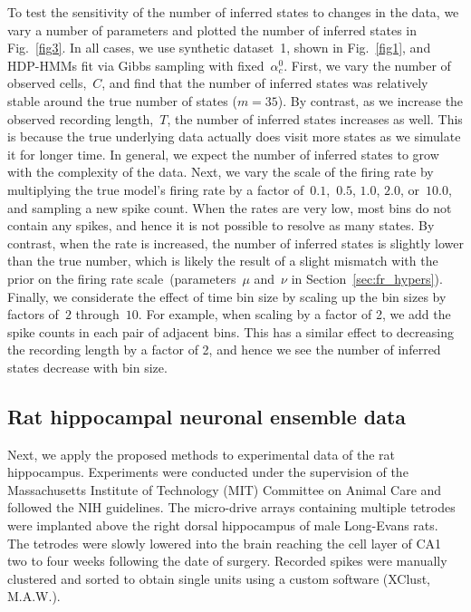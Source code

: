 To test the sensitivity of the number of inferred states to changes in the data, we vary a number of parameters and plotted the number of inferred states in Fig.~\ref{fig3}. In all cases, we use synthetic dataset~1, shown in Fig.~\ref{fig1}, and HDP-HMMs fit via Gibbs sampling with fixed~$\alpha_c^0$. First, we vary the number of observed cells,~$C$, and find that the number of inferred states was relatively stable around the true number of states ($m=35$). By contrast, as we increase the observed recording length,~$T$, the number of inferred states increases as well. This is because the true underlying data actually does visit more states as we simulate it for longer time. In general, we expect the number of inferred states to grow with the complexity of the data. Next, we vary the scale of the firing rate by multiplying the true model's firing rate by a factor of~$0.1$,~$0.5$, $1.0$, $2.0$, or~$10.0$, and sampling a new spike count. When the rates are very low, most bins do not contain any spikes, and hence it is not possible to resolve as many states. By contrast, when the rate is increased, the number of inferred states is slightly lower than the true number, which is likely the result of a slight mismatch with the prior on the firing rate scale~(parameters~$\mu$ and~$\nu$ in Section~\ref{sec:fr_hypers}). Finally, we considerate the effect of time bin size by scaling up the bin sizes by factors of~$2$ through~$10$. For example, when scaling by a factor of 2, we add the spike counts in each pair of adjacent bins. This has a similar effect to decreasing the recording length by a factor of 2, and hence we see the number of inferred states decrease with bin size.

 \subsection{Rat hippocampal neuronal ensemble data} 

Next, we apply the proposed methods to experimental data of the rat hippocampus. 
Experiments were conducted under the supervision of the Massachusetts Institute of Technology (MIT)  Committee on Animal Care and followed the NIH guidelines.
The micro-drive arrays containing multiple tetrodes were implanted above the  right dorsal hippocampus of male Long-Evans rats. The tetrodes were slowly lowered into the brain reaching the cell layer of CA1 two to four weeks following the date of surgery. Recorded spikes were manually  clustered and sorted to obtain single units using a custom software (XClust, M.A.W.). 


